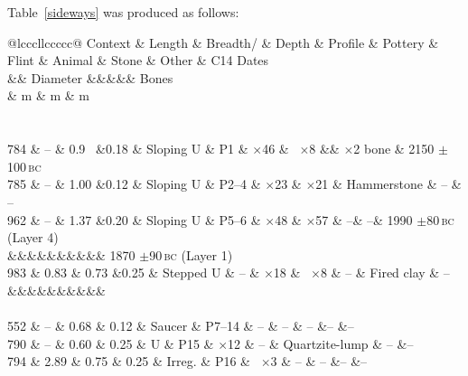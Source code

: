 Table~\ref{sideways} was produced as follows:
%
\begin{smallverbatim}
\begin{table}
  \caption[Landscape table]{Grooved ware and beaker features, their finds and
    radiocarbon dates.}
  \label{sideways}
  \addtolength\tabcolsep{-2pt}
  \begin{tabular}{@{}lcccllccccc@{}}
  \hline\hline
  Context & Length & Breadth/  & Depth & Profile & Pottery & Flint & Animal
                                                   & Stone & Other & C14 Dates\\
  && Diameter &&&&& Bones\\[5pt]
  & m & m & m\\
  \hline\\[-5pt]
  \\
  784 & --   & 0.9$\phantom{0}$ &0.18  & Sloping U & P1      & $\times$46
        & $\phantom{0}$$\times$8 && $\times$2 bone & 2150 $\pm$100\,\textsc{bc}\\
  785 & --   & 1.00             &0.12   & Sloping U & P2--4  & $\times$23
                                           & $\times$21 & Hammerstone & -- & --\\
  962 & --   & 1.37             &0.20   & Sloping U & P5--6  & $\times$48
                     & $\times$57 & --& --& 1990 $\pm$80\,\textsc{bc} (Layer 4)\\
  &&&&&&&&&& 1870 $\pm$90\,\textsc{bc} (Layer 1)\\
  983 & 0.83 & 0.73             &0.25   & Stepped U & --     & $\times$18
                                & $\phantom{0}$$\times$8 & -- & Fired clay & --\\
  &&&&&&&&&&\\
  \\
  552 & --   & 0.68             & 0.12  & Saucer    & P7--14 & --           & --
                                                                   & -- &-- &--\\
  790 & --   & 0.60             & 0.25  & U         & P15    & $\times$12   & --
                                                      & Quartzite-lump & -- &--\\
  794 & 2.89 & 0.75             & 0.25  & Irreg.    & P16    & $\phantom{0}$$\times$3
                                                              & -- & -- &-- &--\\
  \hline\hline
  \end{tabular}
\end{table}
\end{smallverbatim}
